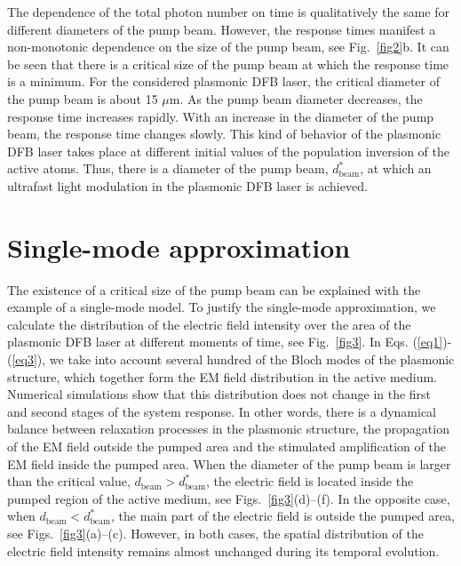 \documentclass[aps,prapplied,amsmath,amssymb,onecolumn,superscriptaddress,showpacs,floatfix,longbibliography]{revtex4-1}
\begin{document}
The dependence of the total photon number on time is qualitatively the same for different diameters of the pump beam.
However, the response times manifest a non-monotonic dependence on the size of the pump beam, see Fig.~\ref{fig2}b.
It can be seen that there is a critical size of the pump beam at which the response time is a minimum.
For the considered plasmonic DFB laser, the critical diameter of the pump beam is about 15 $\mu$m.
As the pump beam diameter decreases, the response time increases rapidly.
With an increase in the diameter of the pump beam, the response time changes slowly.
This kind of behavior of the plasmonic DFB laser takes place at different initial values of the population inversion of the active atoms.
Thus, there is a diameter of the pump beam, $d_{\text{beam}}^*$, at which an ultrafast light modulation in the plasmonic DFB laser is achieved.

\section*{Single-mode approximation}

The existence of a critical size of the pump beam can be explained with the example of a single-mode model. To justify the single-mode approximation, we calculate the distribution of the electric field intensity over the area of the plasmonic DFB laser at different moments of time, see Fig.~\ref{fig3}.
In Eqs. (\ref{eq1})-(\ref{eq3}), we take into account several hundred of the Bloch modes of the plasmonic structure, which together form the EM field distribution in the active medium. Numerical simulations show that this distribution does not change in the first and second stages of the system response. In other words, there is a dynamical balance between relaxation processes in the plasmonic structure, the propagation of the EM field outside the pumped area and the stimulated amplification of the EM field inside the pumped area. When the diameter of the pump beam is larger than the critical value, $d_{\text{beam}} > d_{\text{beam}}^*$, the electric field is located inside the pumped region of the active medium, see Figs.~\ref{fig3}(d)--(f).
In the opposite case, when $d_{\text{beam}} < d_{\text{beam}}^*$, the main part of the electric field is outside the pumped area, see Figs.~\ref{fig3}(a)--(c).
However, in both cases, the spatial distribution of the electric field intensity remains almost unchanged during its temporal evolution. 
\end{document}
